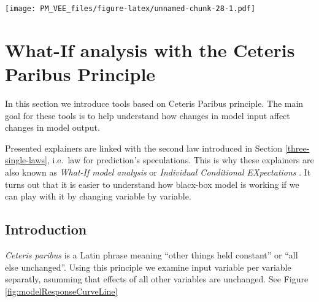 \documentclass[]{krantz}
\theoremstyle{definition}
\theoremstyle{definition}
\theoremstyle{definition}
\theoremstyle{remark}
\begin{document}
\texttt{[image: PM\_VEE\_files/figure-latex/unnamed-chunk-28-1.pdf]}

\hypertarget{ceterisParibus}{%
\section{What-If analysis with the Ceteris Paribus
Principle}\label{ceterisParibus}}

In this section we introduce tools based on Ceteris Paribus principle.
The main goal for these tools is to help understand how changes in model
input affect changes in model output.

Presented explainers are linked with the second law introduced in
Section \ref{three-single-laws}, i.e.~law for prediction's speculations.
This is why these explainers are also known as \emph{What-If model
analysis} or \emph{Individual Conditional EXpectations} \citep{ICEbox}.
It turns out that it is easier to understand how blacx-box model is
working if we can play with it by changing variable by variable.

\hypertarget{introduction-1}{%
\subsection{Introduction}\label{introduction-1}}

\emph{Ceteris paribus} is a Latin phrase meaning ``other things held
constant'' or ``all else unchanged''. Using this principle we examine
input variable per variable separatly, asumming that effects of all
other variables are unchanged. See Figure
\ref{fig:modelResponseCurveLine}
\end{document}
